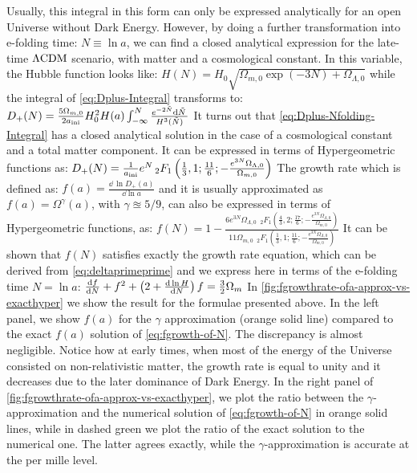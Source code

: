 Usually, this integral in this form can only be expressed analytically for
an open Universe without Dark Energy.
However, by doing a further transformation into e-folding time: $ N \equiv \ln a$,
we can find a closed analytical expression
for the late-time $\Lambda\mathrm{CDM}$ scenario, with matter and a cosmological constant.
In this variable, the Hubble function looks like:
\beeqc$
H(N) = H_0 \sqrt{\Omega_{m,0} \exp{(-3 N)} + \Omega_{\Lambda,0} }
$
while the integral of \cref{eq:Dplus-Integral} transforms to:
\beeqp$\label{eq:Dplus-Nfolding-Integral}
D_{+}(N)  = \frac{5 \Omega_{m,0}}{2 a_{\rm ini}} H_0^2 H(a) \int_{-\infty}^{N} 
\frac{e^{-2 \tilde N} \mathrm{d} {\tilde{N}} \,}{ H^3(\tilde N)}
$
It turns out that \cref{eq:Dplus-Nfolding-Integral} has a closed analytical
solution in the case of a cosmological constant and a total matter component.
It can be expressed in terms of Hypergeometric functions as:
\beeqp$\label{eq:Dplus-Hyper}
D_{+}(N) = \frac{1}{a_{\rm ini}} e^{N} \, _2F_1\left(\frac{1}{3},1;\frac{11}{6};-\frac{e^{3 N} \Omega_{\Lambda,0}}{ \Omega_{m,0} } \right)
$
The growth rate which is defined as:
\beeqc$
f(a) = \frac{\dd{\,\ln} D_{+}(a)}{\dd \ln a} 
$
and it is usually approximated as $f(a)=\Omega^\gamma (a)$,
with $\gamma \approxeq 5/9$, 
can also be expressed in terms of Hypergeometric functions, as:
\beeqp$\label{eq:fgrowth-of-N}
f(N) = 1-\frac{6 e^{3 N} \Omega _{\Lambda ,0} \,\; _2F_1\left(\frac{4}{3},2;\frac{17}{6};-\frac{e^{3 N} \Omega _{\Lambda ,0}}{\Omega _{m,0}}\right)}{11 \Omega _{m,0} \;\, _2F_1\left(\frac{1}{3},1;\frac{11}{6};-\frac{e^{3 N} \Omega_{\Lambda ,0}}{\Omega _{m,0}}\right)}
$
It can be shown that $f(N)$ satisfies exactly the growth rate equation, which can be derived
from \cref{eq:deltaprimeprime} and we express here in terms of the e-folding time
$N = \ln a$:
\beeqp$\label{eq:f-of-N-diffeq}
 \frac{\mathrm{d} {f} }{\mathrm{d} {N}} + f^2 + \left( 2 + \frac{\mathrm{d} {\,\ln H} }{\mathrm{d} {N}} \right) f = \frac{3}{2} \Omega_m
$
In \cref{fig:fgrowthrate-ofa-approx-vs-exacthyper} we show the result
for the formulae presented above. In the left panel,
we show $f(a)$ for the $\gamma$ approximation (orange solid line) compared
to the exact $f(a)$ solution of \cref{eq:fgrowth-of-N}. The discrepancy is almost negligible. Notice how at early times, when most of the energy of the Universe
consisted on non-relativistic matter, the growth rate is equal to unity and it 
decreases due to the later dominance of Dark Energy.
In the right panel of \cref{fig:fgrowthrate-ofa-approx-vs-exacthyper},
we plot the ratio between the $\gamma$-approximation and the numerical solution
of \cref{eq:fgrowth-of-N} in orange solid lines,
while in dashed green we plot the ratio of the exact solution to the numerical one.
The latter agrees exactly, while the $\gamma$-approximation is accurate at the per mille level.

